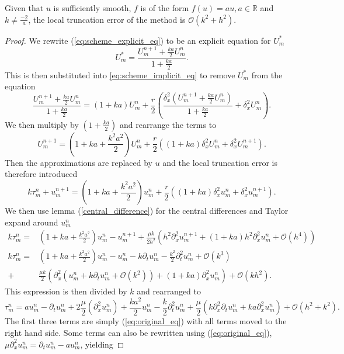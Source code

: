 \begin{theorem}
    \label{consistent}
    Given that $u$ is sufficiently smooth,  $f$ is of the form $f(u)=au, a\in \mathbb{R}$ and $k \neq \frac{-2}{a}$, the local truncation error of the method is $\mathcal{O}(k^2 + h^2).$
\end{theorem}

\begin{proof}
    We rewrite (\ref{eq:scheme_explicit_eq}) to be an explicit equation for $U_m^*$
    $$ U_{m}^{*}= \frac{U_{m}^{n+1}+\frac{ka}{2}U_{m}^{n}}{1+\frac{ka}{2}}.$$
    This is then substituted into \ref{eq:scheme_implicit_eq} to remove $U_{m}^{*}$ from the equation
    $$\frac{U_{m}^{n+1}+\frac{ka}{2}U_{m}^{n}}{1+\frac{ka}{2}} = (1+ka)U_{m}^{n}+\frac{r}{2}\left( \frac{\delta_x^2(U_{m}^{n+1}+\frac{ka}{2}U_{m}^{n})}{1+\frac{ka}{2}}  + \delta_x^2 U_{m}^{n}\right).$$
    We then multiply by $(1+\frac{ka}{2})$ and rearrange the terms to
    $$ U_{m}^{n+1}=(1+ ka + \frac{k^2a^2}{2})U_{m}^{n} + \frac{r}{2}\left((1+ka)\delta_x^2U_{m}^{n} +\delta_x^2U_{m}^{n+1}\right).$$
    Then the approximations are replaced by $u$ and the local truncation error is therefore introduced
    $$ k\tau_m^n + u_{m}^{n+1} = (1+ ka + \frac{k^2a^2}{2})u_{m}^{n} + \frac{r}{2}\left((1+ka)\delta_x^2u_{m}^{n} +\delta_x^2u_{m}^{n+1}\right).$$
    We then use lemma (\ref{central_difference}) for the central differences and Taylor expand around $u_{m}^{n}$
    \begin{align*}
        k \tau_m^n =& \left( 1 + ka +\frac{k^2a^2}{2}\right)u_{m}^{n} - u_{m}^{n+1}+\frac{\mu k}{2h^2} \left(h^2\partial_x^2 u_{m}^{n+1} + \left( 1+ka \right) h^2 \partial_x^2u_{m}^{n} + \mathcal{O}(h^4)\right) \\
        k \tau_m^n =& \left( 1 + ka + \frac{k^2a^2}{2}\right)u_{m}^{n} - u_{m}^{n} - k \partial_tu_{m}^{n} - \frac{k^2}{2} \partial_t^2 u_{m}^{n} + \mathcal{O}(k^3)  \\
        +& \frac{\mu k}{2}\left( \partial_x^2 \left( u_{m}^{n} + k \partial_t u_{m}^{n} + \mathcal{O}(k^2)\right) + \left( 1 + ka\right) \partial_x^2  u_{m}^{n} \right) + \mathcal{O}(kh^2).
    \end{align*}
    This expression is then divided by $k$ and rearranged to 
    $$\tau_m^n = a u_{m}^{n} - \partial_tu_{m}^{n} + 2 \frac{\mu}{2}\left( \partial_x^2 u_{m}^{n}\right) +  \frac{ka^2}{2}u_{m}^{n}  - \frac{k}{2} \partial_t^2 u_{m}^{n} + \frac{\mu }{2}\left( k \partial_x^2 \partial_t u_{m}^{n}  + ka \partial_x^2  u_{m}^{n} \right) + \mathcal{O}(h^2 + k^2).$$
    The first three terms are simply (\ref{eq:original_eq}) with all terms moved to the right hand side. Some terms can also be rewritten using (\ref{eq:original_eq}), $\mu \partial_x^2u_{m}^{n} = \partial_t u_{m}^{n} - au_{m}^{n}$, yielding

\end{proof}
